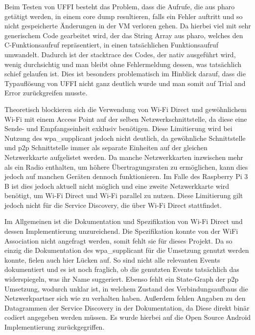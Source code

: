 		Beim Testen von UFFI besteht das Problem, dass die Aufrufe, die aus pharo getätigt werden, in einem core dump resultieren, falls ein Fehler auftritt und so nicht gespeicherte Änderungen in der VM verloren gehen. Da hierbei viel mit sehr generischem Code gearbeitet wird, der das String Array aus pharo, welches den C-Funktionsaufruf repräsentiert, in einen tatsächlichen Funktionsaufruf umwandelt. Dadurch ist der stacktrace des Codes, der nativ ausgeführt wird, wenig durchsichtig und man bleibt ohne Fehlermeldung dessen, was tatsächlich schief gelaufen ist. Dies ist besonders problematisch im Hinblick darauf, dass die Typauflösung von UFFI nicht ganz deutlich wurde und man somit auf Trial and Error zurückgreifen musste.
		
		Theoretisch blockieren sich die Verwendung von Wi-Fi Direct und gewöhnlichem Wi-Fi mit einem Access Point auf der selben Netzwerkschnittstelle, da diese eine Sende- und Empfangseinheit exklusiv benötigen. Diese Limitierung wird bei Nutzung des wpa\_supplicant jedoch nicht deutlich, da gewöhnliche Schnittstelle und p2p Schnittstelle immer als separate Einheiten auf der gleichen Netzwerkkarte aufgelistet werden. Da manche Netzwerkkarten inzwischen mehr als ein Radio enthalten, um höhere Übertragungsraten zu ermöglichen, kann dies jedoch auf manchen Geräten dennoch funktionieren. Im Falle des Raspberry Pi 3 B ist dies jedoch aktuell nicht möglich und eine zweite Netzwerkkarte wird benötigt, um Wi-Fi Direct und Wi-Fi parallel zu nutzen. Diese Limitierung gilt jedoch nicht für die Service Discovery, die über Wi-Fi Direct stattfindet.
		
		Im Allgemeinen ist die Dokumentation und Spezifikation von Wi-Fi Direct und dessen Implementierung unzureichend. Die Spezifikation konnte von der WiFi Association nicht angefragt werden, somit fehlt sie für dieses Projekt. Da so einzig die Dokumentation des wpa\_supplicant für die Umsetzung genutzt werden konnte, fielen auch hier Lücken auf. So sind nicht alle relevanten Events dokumentiert und es ist noch fraglich, ob die genutzten Events tatsächlich das widerspiegeln, was ihr Name suggeriert. Ebenso fehlt ein State-Graph der p2p Umsetzung, wodurch unklar ist, in welchem Zustand des Verbindungsaufbaus die Netzwerkpartner sich wie zu verhalten haben. Außerdem fehlen Angaben zu den Datagrammen der Service Discovery in der Dokumentation, da Diese direkt binär codiert angegeben werden müssen. Es wurde hierbei auf die Open Source Android Implementierung zurückgegriffen.\cite{AI-androidRepo}
		
